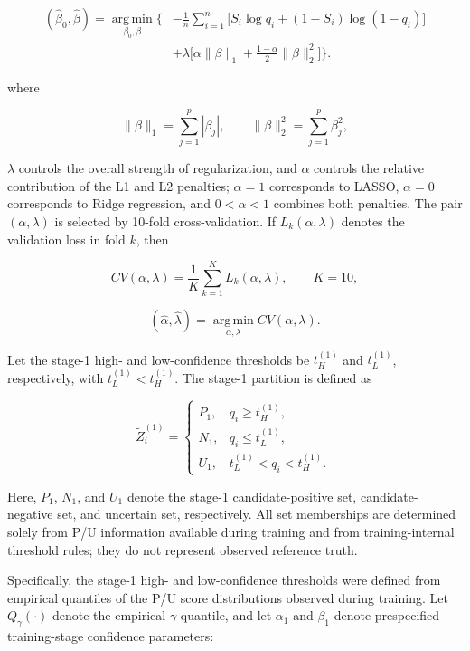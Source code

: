 \documentclass[10pt]{article}
\begin{document}
\[
\begin{aligned}
(\widehat{\beta}_0,\widehat{\beta})
=\operatorname*{arg\,min}_{\beta_0,\beta}\Bigg\{&-\frac{1}{n}\sum_{i=1}^{n}
\Big[S_i\log q_i+(1-S_i)\log(1-q_i)\Big]\\
&+\lambda\Big[\alpha\lVert\beta\rVert_1+\frac{1-\alpha}{2}\lVert\beta\rVert_2^2\Big]\Bigg\}.
\end{aligned}
\]

where

\[\lVert\beta\rVert_1 = \sum_{j = 1}^{p}\left| \beta_{j} \right|,\quad\quad \lVert\beta\rVert_2^2 = \sum_{j = 1}^{p}\beta_{j}^{2},\]

\(\lambda\) controls the overall strength of regularization, and
\(\alpha\) controls the relative contribution of the L1 and L2
penalties; \(\alpha = 1\) corresponds to LASSO, \(\alpha = 0\)
corresponds to Ridge regression, and \(0 < \alpha < 1\) combines both
penalties. The pair \((\alpha,\lambda)\) is selected by 10-fold
cross-validation. If \(L_{k}(\alpha,\lambda)\) denotes the validation
loss in fold \(k\), then

\[CV(\alpha,\lambda) = \frac{1}{K}\sum_{k = 1}^{K}L_{k}(\alpha,\lambda),\quad\quad K = 10,\]

\[\left( \widehat{\alpha},\widehat{\lambda} \right) = \operatorname*{arg\,min}_{\alpha,\lambda}CV(\alpha,\lambda).\]

Let the stage-1 high- and low-confidence thresholds be \(t_{H}^{(1)}\)
and \(t_{L}^{(1)}\), respectively, with \(t_{L}^{(1)} < t_{H}^{(1)}\).
The stage-1 partition is defined as

\[{\widetilde{Z}}_{i}^{(1)} = \left\{ \begin{matrix}
P_{1}, & q_{i} \geq t_{H}^{(1)}, \\
N_{1}, & q_{i} \leq t_{L}^{(1)}, \\
U_{1}, & t_{L}^{(1)} < q_{i} < t_{H}^{(1)}.
\end{matrix} \right.\ \]

Here, \(P_{1}\), \(N_{1}\), and \(U_{1}\) denote the stage-1
candidate-positive set, candidate-negative set, and uncertain set,
respectively. All set memberships are determined solely from P/U
information available during training and from training-internal
threshold rules; they do not represent observed reference truth.

Specifically, the stage-1 high- and low-confidence thresholds were
defined from empirical quantiles of the P/U score distributions observed
during training. Let $Q_\gamma(\cdot)$ denote the empirical $\gamma$ quantile, and let $\alpha_1$
and $\beta_1$ denote prespecified training-stage confidence parameters:
\end{document}

